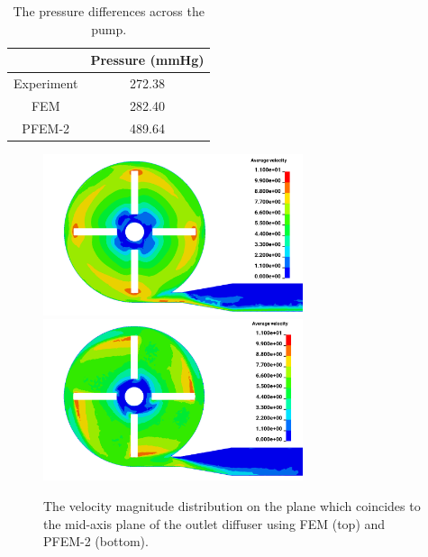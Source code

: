 \begin{table}[h]
\caption {The pressure differences across the pump.}\label{tab:pumppres} 
\centering
\begin{tabular}{|c|c|}
\hline
 & Pressure (mmHg) \\ \hline
Experiment \cite{mali_cfd}    & 272.38    \\ \hline
FEM    & 282.40             \\ \hline
PFEM-2    & 489.64          \\ \hline
\end{tabular}
\end{table}

\begin{figure}[htbp]
    \centering
    \includegraphics[width=3in]{imgs/nozzle_pump/pumpvel_fem.png}\\
    \vspace{.5cm}
    \includegraphics[width=3in]{imgs/nozzle_pump/pumpvel_pfem.png}
    \caption{The velocity magnitude distribution on the plane which coincides to the mid-axis plane of the outlet diffuser using FEM (top) and PFEM-2 (bottom).}
    \label{fig:pumpvel}
\end{figure}

